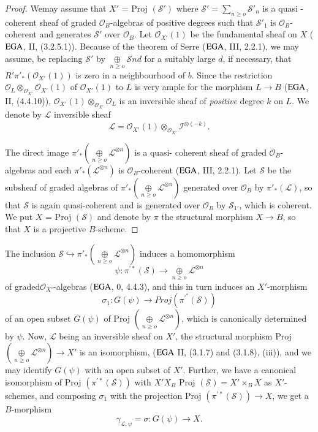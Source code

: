 \begin{proof}
  We\pageoriginale may assume that $X'$ = Proj $(\mathscr{S}')$ where
  $\mathscr{S}' 
  = \sum\limits_{n \geq o } \mathscr{S}'_n$ is a quasi - coherent
  sheaf of graded $\mathscr{O}_B$-algebras of positive degrees such
  that $\mathscr{S}'_1$ is $\mathscr{O}_B$-coherent and generates
  $\mathscr{S}'$ over $\mathscr{O}_B$. Let $\mathscr{O}_{X'}(1)$ be the
  fundamental sheaf on $X$ ($\operatorname{EGA}$, II, (3.2.5.1)). Because of the theorem
  of Serre ($\operatorname{EGA}$, III, 2.2.1), we may assume, be replacing
  $\mathscr{S}'$ by  $\underset{n \geq o}{\oplus} \mathscr{S}nd$ for a
  suitably large $d$, if necessary, that $R'
  \pi'_*(\mathscr{O}_{X'}(1))$ is zero in a neighbourhood of
  $b$. Since the restriction $\mathscr{O}_L \otimes_{\mathscr{O}_{X'}}
  \mathscr{O}_{X'}(1)$ of $\mathscr{O}_{X'} (1)$ to $L$ is very ample
  for the morphism $L  \rightarrow B$ ($\operatorname{EGA}$, II, (4.4.10)),
  $\mathscr{O}_{X'}(1) 
  \otimes_{\mathscr{O}_{X'}}\mathscr{O}_L$ is an inversible sheaf of
  \textit{ positive } degree $k$ on $L$. We denote by $\mathscr{L}$
  inversible sheaf  
  $$
  \mathscr{L}= \mathscr{O}_{X'}(1) \otimes_{\mathscr{O}_{X'}}
  \mathscr{I}^{\otimes (-k)}. 
  $$

  The direct image $\pi'_*(\underset{n \geq o} {\oplus}
  \mathscr{L}^{\otimes n}) $ is a quasi- coherent sheaf of graded
  $\mathscr{O}_B$-algebras and each $\pi'_*(\mathscr{L}^{\otimes n})$
  is $\mathscr{O}_B$-coherent ($\operatorname{EGA}$, III, 2.2.1). Let $\mathscr{S}$ be
  the subsheaf of graded algebras of $\pi'_*(\underset{n \geq o}
  \oplus \mathscr{L}^{\otimes n})$ generated over $\mathscr{O}_B$ by
  $\pi'_*(\mathscr{L})$, so that $\mathscr{S}$ is again quasi-coherent
  and is generated over $\mathscr{O}_B$ by $\mathscr{S}_{1'}$, which
  is coherent. We put $X$ = Proj $(\mathscr{S})$ and denote by $\pi$
  the structural morphism $X \rightarrow B$, so that $X$ is a
  projective $B$-scheme. 
\end{proof}

The inclusion $\mathscr{S}\hookrightarrow \pi'_*(\underset{n \geq o}
\oplus \mathscr{L}^{\otimes n})$ induces a homomorphism 
$$
 \psi : \pi^{'*}(\mathscr{S})\rightarrow \underset{n \geq o} \oplus
 \mathscr{L}^{\otimes n} 
 $$
of graded\pageoriginale $\mathscr{O}_{X'}$-algebras ($\operatorname{EGA}$, 0,
4.4.3), and this in turn induces an $X'$-morphism 
$$ 
\sigma_1 : G(\psi)\rightarrow Proj (\pi^{'^*}(\mathscr{S}))
$$
of an open subset $G(\psi)$ of Proj $(\underset{n \geq o} \oplus
\mathscr{L}^{\otimes n})$, which is canonically determined by
$\psi$. Now, $\mathscr{L}$ being an inversible sheaf on $X'$, the
structural morphism Proj $(\underset{n \geq o} \oplus
\mathscr{L}^{\otimes n})\rightarrow X'$ is an isomorphism, ($\operatorname{EGA}$ II,
(3.1.7) and (3.1.8), (iii)), and we may identify $G(\psi)$ with
an open subset of $X'$. Further, we have a canonical isomorphism of
Proj $(\pi^{'*}(\mathscr{S}))$ with $X' X_B$ Proj $(\mathscr{S})=X'
\times_B X $ as $X'$- schemes, and composing $\sigma_1$ with the projection
Proj $(\pi^{'*}(\mathscr{S}))\rightarrow X$, we get a $B$-morphism 
$$
\gamma_{\mathscr{L}, \psi} = \sigma : G(\psi) \rightarrow X.
$$

